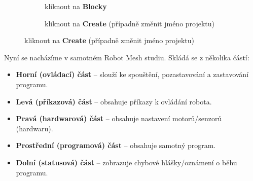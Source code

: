 \documentclass[main.tex]{subfiles}
\begin{document}
\begin{figure}[h!]
\begin{subfigure}[t]{.3\textwidth}
			\caption{kliknout na \textbf{Blocky}}%
		\end{subfigure} \hspace{.045\textwidth}%
		\begin{subfigure}[t]{.3\textwidth}%
			\centering%
			\caption{kliknout na \textbf{Create} (případně změnit jméno projektu)}%
		\end{subfigure}%
	\end{figure}

	\newpage

	Nyní se nacházíme v samotném Robot Mesh studiu. Skládá se z několika částí:

	\begin{itemize}
		\item \textbf{Horní (ovládací) část} -- slouží ke spouštění, pozastavování a zastavování programu.
		\item \textbf{Levá (příkazová) část} -- obsahuje příkazy k ovládání robota.
		\item \textbf{Pravá (hardwarová) část} -- obsahuje nastavení motorů/senzorů (hardwaru).
		\item \textbf{Prostřední (programová) část} -- obsahuje samotný program.
		\item \textbf{Dolní (statusová) část} -- zobrazuje chybové hlášky/oznámení o běhu programu.
	\end{itemize}
\end{document}
